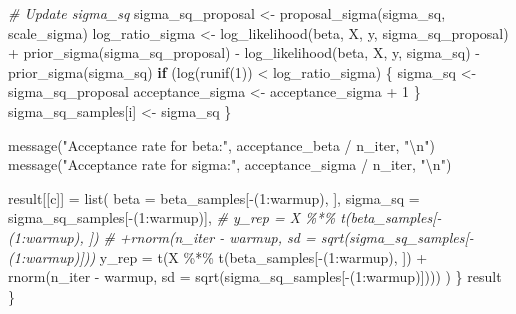 \documentclass[
  letterpaper,
]{krantz}
\newenvironment{Shaded}{}{}
\newcommand{\AttributeTok}[1]{\textcolor[rgb]{0.49,0.56,0.16}{#1}}
\newcommand{\CommentTok}[1]{\textcolor[rgb]{0.38,0.63,0.69}{\textit{#1}}}
\newcommand{\ControlFlowTok}[1]{\textcolor[rgb]{0.00,0.44,0.13}{\textbf{#1}}}
\newcommand{\DecValTok}[1]{\textcolor[rgb]{0.25,0.63,0.44}{#1}}
\newcommand{\FunctionTok}[1]{\textcolor[rgb]{0.02,0.16,0.49}{#1}}
\newcommand{\NormalTok}[1]{#1}
\newcommand{\OtherTok}[1]{\textcolor[rgb]{0.00,0.44,0.13}{#1}}
\newcommand{\SpecialCharTok}[1]{\textcolor[rgb]{0.25,0.44,0.63}{#1}}
\newcommand{\StringTok}[1]{\textcolor[rgb]{0.25,0.44,0.63}{#1}}
\begin{document}
\begin{Shaded}
\begin{Highlighting}[]
            \CommentTok{\# Update sigma\_sq}
\NormalTok{            sigma\_sq\_proposal }\OtherTok{\textless{}{-}} \FunctionTok{proposal\_sigma}\NormalTok{(sigma\_sq, scale\_sigma)}
\NormalTok{            log\_ratio\_sigma }\OtherTok{\textless{}{-}} \FunctionTok{log\_likelihood}\NormalTok{(beta, X, y, sigma\_sq\_proposal) }\SpecialCharTok{+} \FunctionTok{prior\_sigma}\NormalTok{(sigma\_sq\_proposal) }\SpecialCharTok{{-}}
                \FunctionTok{log\_likelihood}\NormalTok{(beta, X, y, sigma\_sq) }\SpecialCharTok{{-}} \FunctionTok{prior\_sigma}\NormalTok{(sigma\_sq)}
            \ControlFlowTok{if}\NormalTok{ (}\FunctionTok{log}\NormalTok{(}\FunctionTok{runif}\NormalTok{(}\DecValTok{1}\NormalTok{)) }\SpecialCharTok{\textless{}}\NormalTok{ log\_ratio\_sigma) \{}
\NormalTok{                sigma\_sq }\OtherTok{\textless{}{-}}\NormalTok{ sigma\_sq\_proposal}
\NormalTok{                acceptance\_sigma }\OtherTok{\textless{}{-}}\NormalTok{ acceptance\_sigma }\SpecialCharTok{+} \DecValTok{1}
\NormalTok{            \}}
\NormalTok{            sigma\_sq\_samples[i] }\OtherTok{\textless{}{-}}\NormalTok{ sigma\_sq}
\NormalTok{        \}}
    
        \FunctionTok{message}\NormalTok{(}\StringTok{"Acceptance rate for beta:"}\NormalTok{, acceptance\_beta }\SpecialCharTok{/}\NormalTok{ n\_iter, }\StringTok{"}\SpecialCharTok{\textbackslash{}n}\StringTok{"}\NormalTok{)}
        \FunctionTok{message}\NormalTok{(}\StringTok{"Acceptance rate for sigma:"}\NormalTok{, acceptance\_sigma }\SpecialCharTok{/}\NormalTok{ n\_iter, }\StringTok{"}\SpecialCharTok{\textbackslash{}n}\StringTok{"}\NormalTok{)}

\NormalTok{        result[[c]] }\OtherTok{=} \FunctionTok{list}\NormalTok{(}
            \AttributeTok{beta =}\NormalTok{ beta\_samples[}\SpecialCharTok{{-}}\NormalTok{(}\DecValTok{1}\SpecialCharTok{:}\NormalTok{warmup), ], }
            \AttributeTok{sigma\_sq =}\NormalTok{ sigma\_sq\_samples[}\SpecialCharTok{{-}}\NormalTok{(}\DecValTok{1}\SpecialCharTok{:}\NormalTok{warmup)],}
            \CommentTok{\# y\_rep = X \%*\% t(beta\_samples[{-}(1:warmup), ])}
            \CommentTok{\# +rnorm(n\_iter {-} warmup, sd = sqrt(sigma\_sq\_samples[{-}(1:warmup)]))}
            \AttributeTok{y\_rep =} \FunctionTok{t}\NormalTok{(X }\SpecialCharTok{\%*\%} \FunctionTok{t}\NormalTok{(beta\_samples[}\SpecialCharTok{{-}}\NormalTok{(}\DecValTok{1}\SpecialCharTok{:}\NormalTok{warmup), ]) }\SpecialCharTok{+} \FunctionTok{rnorm}\NormalTok{(n\_iter }\SpecialCharTok{{-}}\NormalTok{ warmup, }\AttributeTok{sd =} \FunctionTok{sqrt}\NormalTok{(sigma\_sq\_samples[}\SpecialCharTok{{-}}\NormalTok{(}\DecValTok{1}\SpecialCharTok{:}\NormalTok{warmup)])))}
\NormalTok{        )}
\NormalTok{    \} }
\NormalTok{    result}
\NormalTok{\}}


\end{Highlighting}
\end{Shaded}
\end{document}
